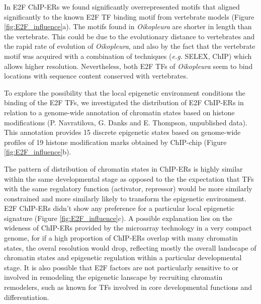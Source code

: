 \documentclass[11pt,twoside,a4paper]{report}
\begin{document}
		In E2F ChIP-ERs we found significantly overrepresented motifs that aligned significantly to the known E2F TF binding motif from vertebrate models (Figure \ref{fig:E2F_influence}a). The motifs found in \textit{Oikopleura} are shorter in length than the vertebrate. This could be due to the evolutionary distance to vertebrates and the rapid rate of evolution of \textit{Oikopleura}, and also by the fact that the vertebrate motif was acquired with a combination of techniques (\textit{e.g.} SELEX, ChIP) which allows higher resolution. Nevertheless, both E2F TFs of \textit{Oikopleura} seem to bind locations with sequence content conserved with vertebrates.
		
		To explore the possibility that the local epigenetic environment conditions the binding of the E2F TFs, we investigated the distribution of E2F ChIP-ERs in relation to a genome-wide annotation of chromatin states based on histone modifications (P. Navratilova, G. Danks and E. Thompson, unpublished data). This annotation provides 15 discrete epigenetic states based on genome-wide profiles of 19 histone modification marks obtained by ChIP-chip (Figure \ref{fig:E2F_influence}b). 
		
		The pattern of distribution of chromatin states in ChIP-ERs is highly similar within the same developmental stage as opposed to the the expectation that TFs with the same regulatory function (activator, repressor) would be more similarly constrained and more similarly likely to transform the epigenetic environment. E2F ChIP-ERs didn't show any preference for a particular local epigenetic signature (Figure \ref{fig:E2F_influence}c). A possible explanation lies on the wideness of ChIP-ERs provided by the microarray technology in a very compact genome, for if a high proportion of ChIP-ERs overlap with many chromatin states, the overal resolution would drop, reflecting mostly the overall landscape of chromatin states and epigenetic regulation within a particular developmental stage. It is also possible that E2F factors are not particularly sensitive to or involved in remodeling the epigenetic lanscape by recruiting chromatin remodelers, such as known for TFs involved in core developmental functions and differentiation.
		
\end{document}
